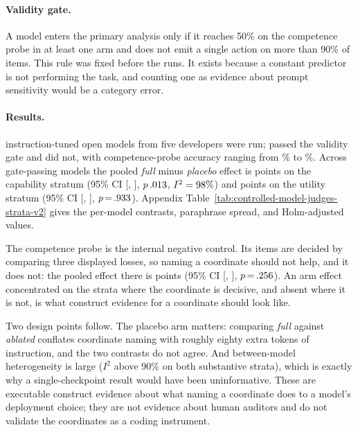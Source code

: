 \documentclass[11pt]{article}
\begin{document}
\paragraph{Validity gate.}
A model enters the primary analysis only if it reaches 50\% on the competence
probe in at least one arm and does not emit a single action on more than 90\%
of items. This rule was fixed before the runs. It exists because a constant
predictor is not performing the task, and counting one as evidence about
prompt sensitivity would be a category error.



\paragraph{Results.}
\CMJmodels{} instruction-tuned open models from five developers were run;
\CMJpassing{} passed the validity gate and \CMJfailing{} did not, with
competence-probe accuracy ranging from \CMJprobeMin\% to \CMJprobeMax\%.
Across gate-passing models the pooled \emph{full} minus \emph{placebo} effect
is \CMJCtwoPooled{} points on the capability stratum
(95\% CI [\CMJCtwoLow, \CMJCtwoHigh], $p\,.013$, $I^2=98\%$) and
\CMJCfivePooled{} points on the utility stratum
(95\% CI [\CMJCfiveLow, \CMJCfiveHigh], $p\,{=}\,.933$). Appendix
Table~\ref{tab:controlled-model-judges-strata-v2} gives the per-model
contrasts, paraphrase spread, and Holm-adjusted values.

The competence probe is the internal negative control. Its items are decided
by comparing three displayed losses, so naming a coordinate should not help,
and it does not: the pooled effect there is \CMJProbePooled{} points
(95\% CI [\CMJProbeLow, \CMJProbeHigh], $p\,{=}\,.256$). An arm effect
concentrated on the strata where the coordinate is decisive, and absent where
it is not, is what construct evidence for a coordinate should look like.

Two design points follow. The placebo arm matters: comparing \emph{full}
against \emph{ablated} conflates coordinate naming with roughly eighty extra
tokens of instruction, and the two contrasts do not agree. And between-model
heterogeneity is large ($I^2$ above 90\% on both substantive strata), which is
exactly why a single-checkpoint result would have been uninformative. These
are executable construct evidence about what naming a coordinate does to a
model's deployment choice; they are not evidence about human auditors and do
not validate the coordinates as a coding instrument.
\end{document}
